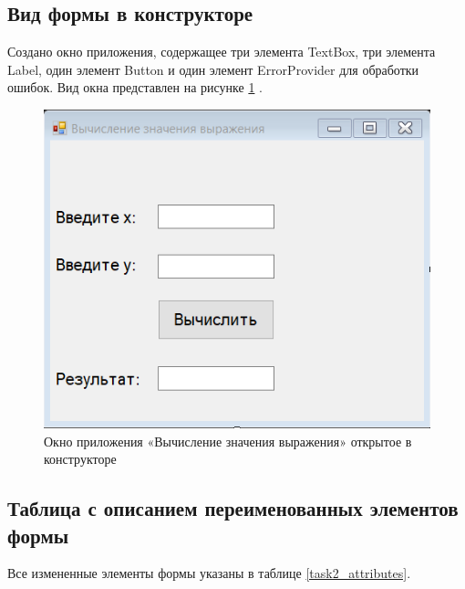 \subsection{Вид формы в конструкторе}
Создано окно приложения, содержащее три элемента TextBox, три элемента
Label, один элемент Button и один элемент ErrorProvider для обработки ошибок. Вид окна представлен на рисунке \ref{task2_form} \cite{никлаус2022алгоритмы}.
\begin{figure}[H]
    \centering
    \includegraphics[width=0.5\linewidth]{lections/img/task2_form.png}
    \caption{Окно приложения «Вычисление значения выражения» открытое в конструкторе}
    \label{task2_form}
\end{figure}


\subsection{Таблица с описанием переименованных элементов формы}
Все измененные элементы формы указаны в таблице \ref{task2_attributes}.

